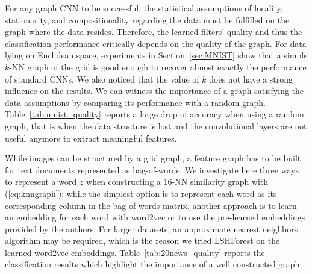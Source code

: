 \documentclass{article}
\newcommand{\tabref}[1]{Table~\ref{tab:#1}}
\newcommand{\secref}[1]{Section~\ref{sec:#1}}
\newcommand{\eqnref}[1]{(\ref{eq:#1})}
\begin{document}


For any graph CNN to be successful, the statistical assumptions of locality,
stationarity, and compositionality regarding the data must be fulfilled on the
graph where the data resides. Therefore, the learned filters' quality and thus
the classification performance critically depends on the quality of the graph.
For data lying on Euclidean space, experiments in \secref{MNIST} show that a
simple $k$-NN graph of the grid is good enough to recover almost exactly the
performance of standard CNNs. We also noticed that the value of $k$ does not
have a strong influence on the results. We can witness the importance of a
graph satisfying the data assumptions by comparing its performance with a
random graph. \tabref{mnist_quality} reports a large drop of accuracy when
using a random graph, that is when the data structure is lost and the
convolutional layers are not useful anymore to extract meaningful features.

While images can be structured by a grid graph, a feature graph has to be built
for text documents represented as bag-of-words.  We investigate here three ways
to represent a word $z$ when constructing a $16$-NN similarity graph with
\eqnref{knngraph}: while the simplest option is to represent each word as its
corresponding column in the bag-of-words matrix, another approach is to learn
an embedding for each word with word2vec
\cite{pro:MikolovChenCorradoDean13word2vec} or to use the pre-learned
embeddings provided by the authors. For larger datasets, an approximate nearest
neighbors algorithm may be required, which is the reason we tried LSHForest
\cite{pro:BawaCondieGanesan05LSHForest} on the learned word2vec embeddings.
\tabref{20news_quality} reports the classification results which highlight the
importance of a well constructed graph.

\end{document}
